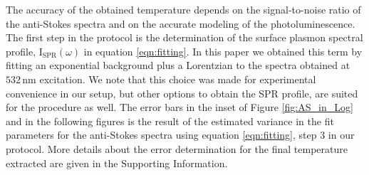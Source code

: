 \documentclass[journal=nalefd,manuscript=letter]{achemso}
\newcommand{\HI}[1]{{#1}} %
\newcommand{\nm}{\ensuremath{\,\textrm{nm}}}
\begin{document}
\HI{The accuracy of the obtained temperature depends on the signal-to-noise ratio of the 
anti-Stokes spectra and on the accurate modeling of the photoluminescence.
The first step in the protocol is the determination
of the surface plasmon spectral profile, $\textrm{I}_\textrm{SPR}(\omega)$ in equation \ref{eqn:fitting}. 
In this paper we obtained this term by fitting an exponential background plus a Lorentzian to the spectra
obtained at $532\nm$ excitation. We note
that this choice was made for experimental convenience in our setup, but other options to
obtain the SPR profile, are suited for the procedure as well.}
\HI{The error bars in the inset of Figure \ref{fig:AS_in_Log} and in the following figures 
is the result of the estimated variance in the fit parameters for the 
anti-Stokes spectra using equation \ref{eqn:fitting}, step 3 in our protocol. More details
about the error determination for the final temperature extracted are given in the Supporting
Information.}
\end{document}
